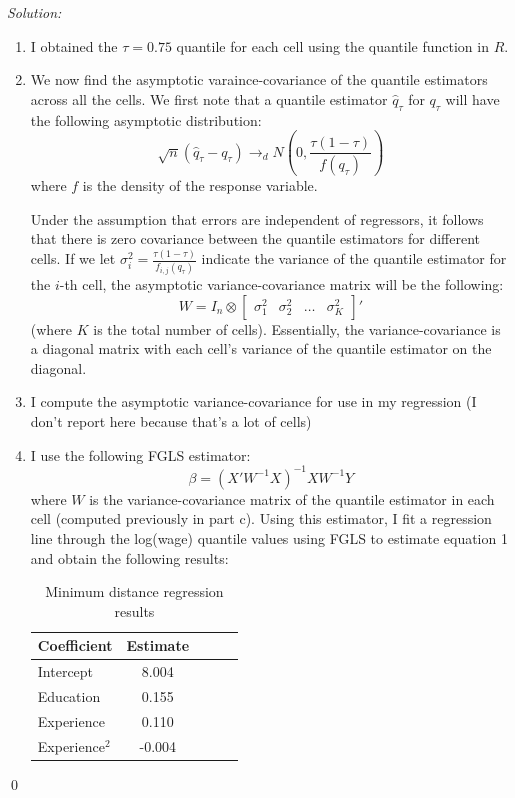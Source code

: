\documentclass[12pt]{article}
\newenvironment{sol}
    {\emph{Solution:}
    }
    {
    \qed
    }
\begin{document}
\begin{sol}
  \begin{enumerate}[label=\alph*) ]
  \item I obtained the $\tau = 0.75$ quantile for each cell using the quantile function in $R$.
  \item We now find the asymptotic varaince-covariance of the quantile estimators across all the cells. We first note that a quantile estimator $\hat{q}_{\tau}$ for $q_{\tau}$ will have the following asymptotic distribution:
  \[\sqrt{n}(\hat{q}_{\tau} - q_{\tau}) \rightarrow_d N(0, \frac{\tau(1-\tau)}{f(q_{\tau})})\]
  where $f$ is the density of the response variable. 

  Under the assumption that errors are independent of regressors, it follows that there is zero covariance between the quantile estimators for different cells. If we let $\sigma_{i}^2 = \frac{\tau (1-\tau)}{f_{i,j}(q_{\tau})}$ indicate the variance of the quantile estimator for the $i$-th cell, the asymptotic variance-covariance matrix will be the following:
  \[W = I_n \otimes \begin{bmatrix}\sigma_{1}^2 & \sigma_2^2 & \hdots & \sigma_K^2\end{bmatrix}'\]
  (where $K$ is the total number of cells). Essentially, the variance-covariance is a diagonal matrix with each cell's variance of the quantile estimator on the diagonal.
  \item I compute the asymptotic variance-covariance for use in my regression (I don't report here because that's a lot of cells)
  \item I use the following FGLS estimator:
  \[\beta = (X' W^{-1} X)^{-1} X W^{-1} Y\]
  where $W$ is the variance-covariance matrix of the quantile estimator in each cell (computed previously in part c). Using this estimator, I fit a regression line through the log(wage) quantile values using FGLS to estimate equation 1 and obtain the following results:
  \begin{table}[htbp]
    \centering
    \caption{Minimum distance regression results}
      \begin{tabular}{lcccc}
          \toprule
            Coefficient          & Estimate          \\
          \midrule
          Intercept & 8.004  \\
          Education & 0.155 \\
          Experience & 0.110 \\
          Experience$^2$ & -0.004  \\
          \bottomrule
      \end{tabular}
    \label{tab:mdreg}
  \end{table}
  

\end{enumerate}
\end{sol}
\end{document}
